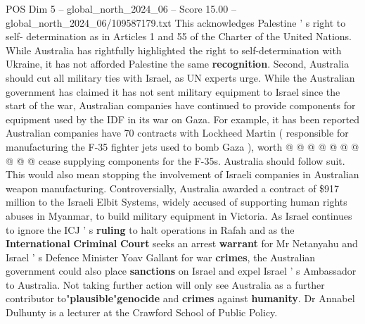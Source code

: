\begin{textsample}{POS Dim 5 – global\_north\_2024\_06 – Score 15.00 – global\_north\_2024\_06/109587179.txt}
This acknowledges Palestine ' s right to self- determination as in Articles 1 and 55 of the Charter of the United Nations.
While Australia has rightfully highlighted the right to self-determination with Ukraine, it has not afforded Palestine the same \textbf{recognition}.
Second, Australia should cut all military ties with Israel, as UN experts urge.
While the Australian government has claimed it has not sent military equipment to Israel since the start of the war, Australian companies have continued to provide components for equipment used by the IDF in its war on Gaza.
For example, it has been reported Australian companies have 70 contracts with Lockheed Martin ( responsible for manufacturing the F-35 fighter jets used to bomb Gaza ), worth @ @ @ @ @ @ @ @ @ @ cease supplying components for the F-35s.
Australia should follow suit.
This would also mean stopping the involvement of Israeli companies in Australian weapon manufacturing.
Controversially, Australia awarded a contract of \$917 million to the Israeli Elbit Systems, widely accused of supporting human rights abuses in Myanmar, to build military equipment in Victoria.
As Israel continues to ignore the ICJ ' s \textbf{ruling} to halt operations in Rafah and as the \textbf{International} \textbf{Criminal} \textbf{Court} seeks an arrest \textbf{warrant} for Mr Netanyahu and Israel ' s Defence Minister Yoav Gallant for war \textbf{crimes}, the Australian government could also place \textbf{sanctions} on Israel and expel Israel ' s Ambassador to Australia.
Not taking further action will only see Australia as a further contributor to"\textbf{plausible}"\textbf{genocide} and \textbf{crimes} against \textbf{humanity}.
Dr Annabel Dulhunty is a lecturer at the Crawford School of Public Policy.

\end{textsample}
